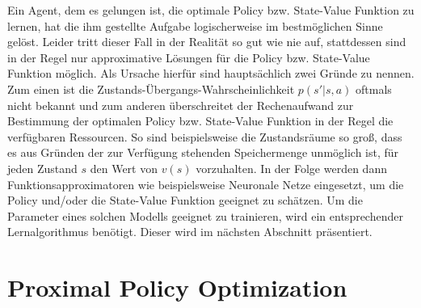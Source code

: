 Ein Agent, dem es gelungen ist, die optimale Policy bzw. State-Value Funktion zu lernen, hat die ihm gestellte Aufgabe logischerweise im bestmöglichen Sinne gelöst. Leider tritt dieser Fall in der Realität so gut wie nie auf, stattdessen sind in der Regel nur approximative Lösungen für die Policy bzw. State-Value Funktion möglich. Als Ursache hierfür sind hauptsächlich zwei Gründe zu nennen. Zum einen ist die Zustands-Übergangs-Wahrscheinlichkeit $p(s'|s,a)$ oftmals nicht bekannt und zum anderen überschreitet der Rechenaufwand zur Bestimmung der optimalen Policy bzw. State-Value Funktion in der Regel die verfügbaren Ressourcen. So sind beispielsweise die Zustandsräume so groß, dass es aus Gründen der zur Verfügung stehenden Speichermenge unmöglich ist, für jeden Zustand $s$ den Wert von $v(s)$ vorzuhalten. In der Folge werden dann Funktionsapproximatoren wie beispielsweise Neuronale Netze eingesetzt, um die Policy und/oder die State-Value Funktion geeignet zu schätzen. Um die Parameter eines solchen Modells geeignet zu trainieren, wird ein entsprechender Lernalgorithmus benötigt. Dieser wird im nächsten Abschnitt präsentiert.


\section{Proximal Policy Optimization}
\label{sec_ppo}

